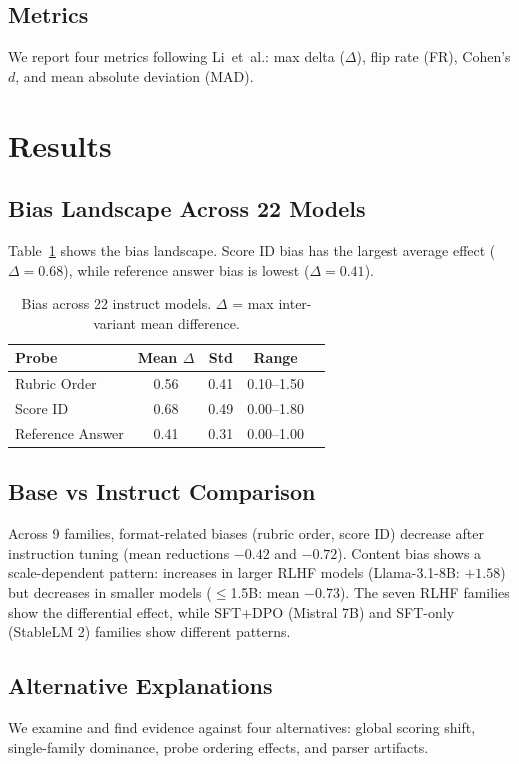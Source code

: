 \documentclass[11pt,a4paper]{article}
\begin{document}
\subsection{Metrics}
We report four metrics following Li~et~al.: max delta ($\Delta$), flip rate (FR), Cohen's $d$, and mean absolute deviation (MAD).

\section{Results}

\subsection{Bias Landscape Across 22 Models}
Table~\ref{tab:main} shows the bias landscape. Score ID bias has the largest average effect ($\Delta = 0.68$), while reference answer bias is lowest ($\Delta = 0.41$).

\begin{table}[h]
\centering\small
\caption{Bias across 22 instruct models. $\Delta$ = max inter-variant mean difference.}
\label{tab:main}
\begin{tabular}{lcccc}
\toprule
\textbf{Probe} & \textbf{Mean $\Delta$} & \textbf{Std} & \textbf{Range} \\
\midrule
Rubric Order & 0.56 & 0.41 & 0.10--1.50 \\
Score ID & 0.68 & 0.49 & 0.00--1.80 \\
Reference Answer & 0.41 & 0.31 & 0.00--1.00 \\
\bottomrule
\end{tabular}
\end{table}

\subsection{Base vs Instruct Comparison}
Across 9 families, format-related biases (rubric order, score ID) decrease after instruction tuning (mean reductions $-0.42$ and $-0.72$). Content bias shows a scale-dependent pattern: increases in larger RLHF models (Llama-3.1-8B: $+1.58$) but decreases in smaller models ($\leq$1.5B: mean $-0.73$). The seven RLHF families show the differential effect, while SFT+DPO (Mistral 7B) and SFT-only (StableLM 2) families show different patterns.

\subsection{Alternative Explanations}
We examine and find evidence against four alternatives: global scoring shift, single-family dominance, probe ordering effects, and parser artifacts.
\end{document}
